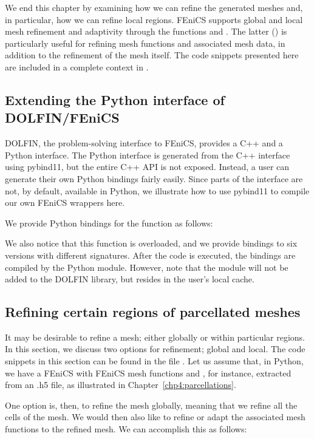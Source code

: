 We end this chapter by examining how we can refine the generated
meshes and, in particular, how we can refine local regions. FEniCS
supports global and local mesh refinement and adaptivity through the
functions  and . The latter
() is particularly useful for refining mesh
functions and associated mesh data, in addition to the refinement of
the mesh itself. The code snippets presented here are included in
a complete context in . 

\subsection{Extending the Python interface of DOLFIN/FEniCS}
DOLFIN, the problem-solving interface to FEniCS, provides a C++ and a
Python interface. The Python interface is generated from the C++
interface using pybind11, but the entire C++ API is not
exposed. Instead, a user can generate their own Python bindings fairly
easily. Since parts of the  interface are not, by
default, available in Python, we illustrate how to use pybind11 to
compile our own FEniCS wrappers here.

We provide Python bindings for the  function as follows: 

We also notice that this function is overloaded, and we provide
bindings to six versions with different signatures. After the code is
executed, the bindings are compiled by the Python module. However,
note that the module will not be added to the DOLFIN library, but
resides in the user's local cache.

\subsection{Refining certain regions of parcellated meshes}
It may be desirable to refine a mesh; either globally or within particular 
regions.  In this section, we discuss two options for refinement; global and 
local.  The code snippets in this section can be found in the file 
.  Let us assume that, 
in Python, we have a FEniCS  with FEniCS mesh functions 
 and , for instance, extracted from an .h5 file, 
as illustrated in Chapter~\ref{chp4:parcellations}. 

One option is, then, to refine the mesh globally, meaning that we refine
all the cells of the mesh. We would then also like to refine or adapt the
associated mesh functions to the refined mesh. We can accomplish this
as follows:

